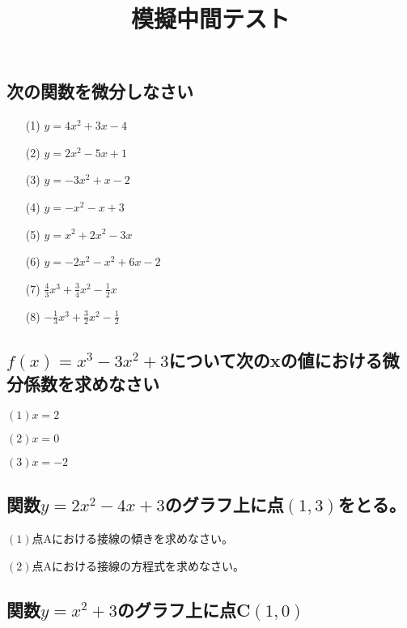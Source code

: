 \documentclass[12pt]{jarticle}
\title{模擬中間テスト}
\begin{document}
\date{}
\maketitle
\vspace{-2cm}
\subsection{次の関数を微分しなさい}
\begin{itemize}
  \item [(1)] $ \displaystyle y = 4x^2 + 3x -4$
  \item [(2)] $\displaystyle y = 2x^2 -5x + 1$
  \item [(3)] $\displaystyle y = -3x^2 + x -2$
  \item [(4)] $\displaystyle y = -x^2 -x + 3$
  \item [(5)] $\displaystyle y = x^2 + 2x^2 -3x$
  \item [(6)] $\displaystyle y = -2x^2 -x^2 + 6x -2$
  \item [(7)] $\displaystyle \frac{4}{3}x^3 + \frac{3}{4}x^2-\frac{1}{2}x$
  \item [(8)] $\displaystyle -\frac{1}{3}x^3 + \frac{3}{2}x^2-\frac{1}{2}$
\end{itemize}

\subsection{$f(x)=x^3-3x^2+3$について次のxの値における微分係数を求めなさい}
$(1)x=2$

$(2)x=0$

$(3)x=-2$
\subsection{関数$y=2x^2 -4x +3$のグラフ上に点$(1, 3)$をとる。}
$(1)$点Aにおける接線の傾きを求めなさい。

$(2)$点Aにおける接線の方程式を求めなさい。

\subsection{関数$y=x^2+3$のグラフ上に点C$(1, 0)$}
\end{document}
